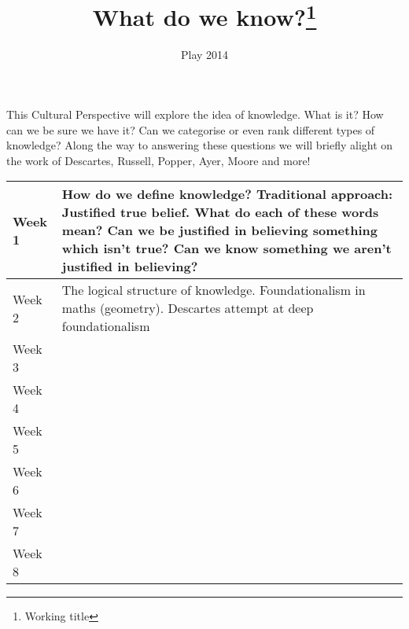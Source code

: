 \documentclass[10pt]{article}
\title{What do we know?\footnote{Working title}}
\date{Play 2014}
\begin{document}
\maketitle\thispagestyle{empty}
 This Cultural Perspective will explore the idea of knowledge. What is it? How can we be sure we have it? Can we categorise or even rank different types of knowledge? Along the way to answering these questions we will briefly alight on the work of Descartes, Russell, Popper, Ayer, Moore and more! 
\begin{table}[htdp]
\normalsize
\begin{center}
\begin{tabular}{|p{}|p{}|}
\hline
Week 1 & How do we define knowledge? Traditional approach: Justified true belief. What do each of these words mean? Can we be justified in believing something which isn't true? Can we know something we aren't justified in believing? \\ \hline
Week 2 & The logical structure of knowledge. Foundationalism in maths (geometry). Descartes attempt at deep foundationalism \\ \hline
Week 3 &\vspace{2cm} \\ \hline 
Week 4 &\vspace{2cm} \\ \hline
Week 5 &\vspace{2cm} \\ \hline
Week 6 &\vspace{2cm} \\ \hline
Week 7 &\vspace{2cm} \\ \hline
Week 8 &\vspace{2cm} \\ \hline

\end{tabular}
\end{center}
\label{default}
\end{table}%
\end{document}
